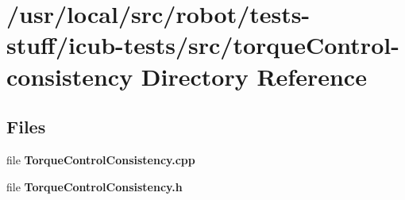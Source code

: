 \section{/usr/local/src/robot/tests-\/stuff/icub-\/tests/src/torque\-Control-\/consistency Directory Reference}
\label{dir_bdcb24c47bb1acc4d18ac37bcdabe4da}
\subsection*{Files}
\begin{DoxyCompactItemize}
\item 
file {\bfseries Torque\-Control\-Consistency.\-cpp}
\item 
file {\bfseries Torque\-Control\-Consistency.\-h}
\end{DoxyCompactItemize}
